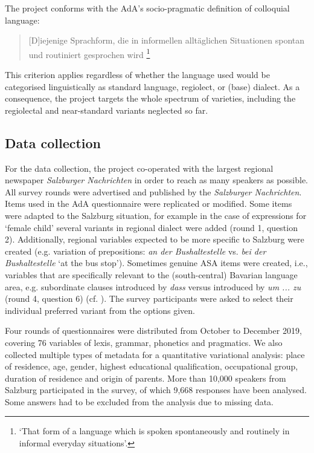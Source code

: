 \documentclass[output=paper,colorlinks, citecolor=brown]{langscibook}
\begin{document}
The project conforms with the AdA’s socio-pragmatic definition of colloquial language:

\begin{quote}
[D]iejenige Sprachform, die in informellen alltäglichen Situationen spontan und routiniert gesprochen wird \citep[419]{Elspaß2010}\footnote{`That form of a language which is spoken spontaneously and routinely in informal everyday situations'.}
\end{quote}

This criterion applies regardless of whether the language used would be categorised linguistically as standard language, regiolect, or (base) dialect. As a consequence, the project targets the whole spectrum of varieties, including the regiolectal and near-standard variants neglected so far.

\subsection{Data collection} \label{sec:blaßnigg:2.2}

For the data collection, the project co-operated with the largest regional newspaper \textit{Salzburger Nachrichten} in order to reach as many speakers as possible. All survey rounds were advertised and published by the \textit{Salzburger Nachrichten}. Items used in the AdA questionnaire were replicated or modified. Some items were adapted to the Salzburg situation, for example in the case of expressions for `female child' several variants in regional dialect were added (round 1, question 2). Additionally, regional variables expected to be more specific to Salzburg were created (e.g. variation of prepositions: \textit{an der Bushaltestelle} vs. \textit{bei der Bushaltestelle} ‘at the bus stop’). Sometimes genuine ASA items were created, i.e., variables that are specifically relevant to the (south-central) Bavarian language area, e.g. subordinate clauses introduced by \textit{dass} versus introduced by \textit{um ... zu} (round 4, question 6) (cf. \citealt{Bayer2020}). The survey participants were asked to select their individual preferred variant from the options given.

Four rounds of questionnaires were distributed from October to December 2019, covering 76 variables of lexis, grammar, phonetics and pragmatics. We also collected multiple types of metadata for a quantitative variational analysis: place of residence, age, gender, highest educational qualification, occupational group, duration of residence and origin of parents. More than 10,000 speakers from Salzburg participated in the survey, of which 9,668 responses have been analysed. Some answers had to be excluded from the analysis due to missing data.
\end{document}
